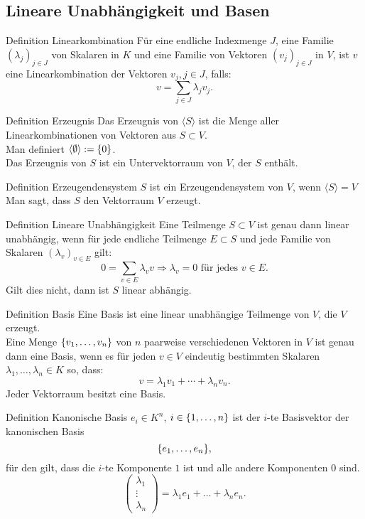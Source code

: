 \documentclass[main.tex]{subfiles}
\begin{document}
\subsection*{Lineare Unabhängigkeit und Basen}
\begin{karte}{Definition Linearkombination}
    Für eine endliche Indexmenge \(J\), eine Familie 
    \( {(\lambda_j)}_{j \in J} \) von Skalaren in 
    \(K\) und eine Familie von Vektoren 
    \( {(v_j)}_{j \in J} \) in \(V\), ist \(v\) eine 
    Linearkombination der Vektoren \(v_j, j \in J\), falls: 
    \[v = \sum_{j \in J} \lambda_j v_j. \]
\end{karte}
\begin{karte}{Definition Erzeugnis}
    Das Erzeugnis von \(\langle S \rangle \) ist die Menge 
    aller Linearkombinationen von Vektoren aus \(S \subset V\). \\
    Man definiert \(\langle \emptyset \rangle : = \{0\}\). \\
    Das Erzeugnis von \(S\) ist ein Untervektorraum von \(V\), 
    der \(S\) enthält.
\end{karte}
\begin{karte}{Definition Erzeugendensystem}
    \(S\) ist ein Erzeugendensystem von \(V\), wenn \(\langle S \rangle = V\) \\
    Man sagt, dass \(S\) den Vektorraum \(V\) erzeugt.
\end{karte}
\begin{karte}{Definition Lineare Unabhängigkeit}
    Eine Teilmenge \(S \subset V\) ist genau dann linear unabhängig,
    wenn für jede endliche Teilmenge \(E \subset S\) 
    und jede Familie von Skalaren \( {(\lambda_v)}_{v \in E}\) gilt: 
    \[ 0 = \sum_{v \in E} \lambda_v v \Rightarrow \lambda_v = 0 
    \text{ für jedes } v \in E. \]
    Gilt dies nicht, dann ist \(S\) linear abhängig.
\end{karte}
\begin{karte}{Definition Basis}
    Eine Basis ist eine linear unabhängige Teilmenge von \(V\), die
    \(V\) erzeugt. \\
    Eine Menge \(\{v_1, \ldots ,v_n\}\) von \(n\) paarweise verschiedenen 
    Vektoren in \(V\) ist genau dann eine Basis, wenn es für jeden \(v \in V\)
    eindeutig bestimmten Skalaren \(\lambda_1, \ldots , \lambda_n \in K\)
    so, dass: 
    \[v = \lambda_1 v_1 + \cdots + \lambda_n v_n.\]
    Jeder Vektorraum besitzt eine Basis. 
\end{karte}
\begin{karte}{Definition Kanonische Basis}
    \(e_i \in K^n\), \(i \in \{1, \ldots, n\}\) ist der 
    \(i\)-te Basisvektor der kanonischen Basis
    \[ \{e_1, \ldots,e_n\}, \] für den gilt, dass die 
    \(i\)-te Komponente \(1\) ist und alle andere 
    Komponenten \(0\) sind.
    \[ \left(
        \begin{array}{c}
        \lambda_1 \\
        \vdots \\
        \lambda_n
        \end{array}
        \right) = \lambda_1 e_1 + \ldots + \lambda_n e_n. \]
\end{karte}
\end{document}
